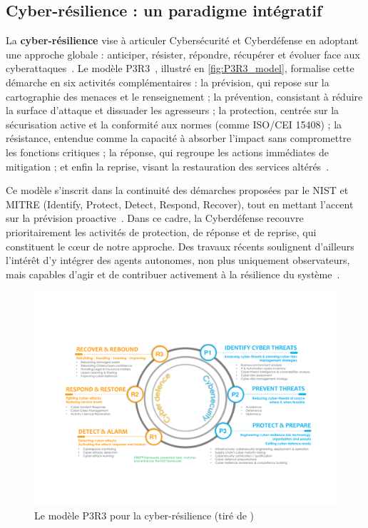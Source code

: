 \subsection*{Cyber-résilience : un paradigme intégratif}

La \textbf{cyber-résilience} vise à articuler Cybersécurité et Cyberdéfense en adoptant une approche globale : anticiper, résister, répondre, récupérer et évoluer face aux cyberattaques~\cite{NISTresilience}. Le modèle P3R3~\cite{Theron2013P3R3}, illustré en \autoref{fig:P3R3_model}, formalise cette démarche en six activités complémentaires : la prévision, qui repose sur la cartographie des menaces et le renseignement ; la prévention, consistant à réduire la surface d'attaque et dissuader les agresseurs ; la protection, centrée sur la sécurisation active et la conformité aux normes (comme ISO/CEI 15408) ; la résistance, entendue comme la capacité à absorber l'impact sans compromettre les fonctions critiques ; la réponse, qui regroupe les actions immédiates de mitigation ; et enfin la reprise, visant la restauration des services altérés~\cite{Theron2013P3R3}.

Ce modèle s'inscrit dans la continuité des démarches proposées par le \ac{NIST} et MITRE (Identify, Protect, Detect, Respond, Recover), tout en mettant l'accent sur la prévision proactive~\cite{Theron2013P3R3}. Dans ce cadre, la Cyberdéfense recouvre prioritairement les activités de protection, de réponse et de reprise, qui constituent le cœur de notre approche. Des travaux récents soulignent d'ailleurs l'intérêt d'y intégrer des agents autonomes, non plus uniquement observateurs, mais capables d'agir et de contribuer activement à la résilience du système~\cite{Kott2023}.

\begin{figure}[h]
    \centering
    \includegraphics[width=\linewidth]{figures/P3R3.pdf}
    \caption{Le modèle P3R3 pour la cyber-résilience (tiré de \autocite{Kott2023})}
    \label{fig:P3R3_model}
\end{figure}

